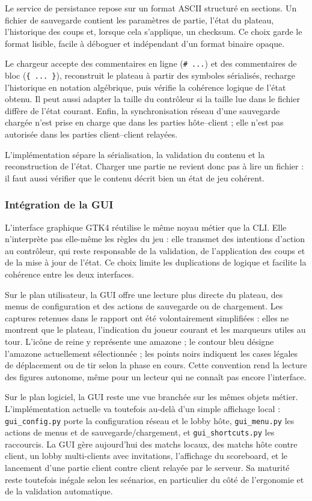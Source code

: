 \documentclass[a4paper]{article}
\begin{document}
Le service de persistance repose sur un format ASCII structuré en sections. Un fichier de sauvegarde contient les paramètres de partie, l'état du plateau, l'historique des coups et, lorsque cela s'applique, un checksum. Ce choix garde le format lisible, facile à déboguer et indépendant d'un format binaire opaque.

Le chargeur accepte des commentaires en ligne (\texttt{\# ...}) et des commentaires de bloc (\texttt{\{ ... \}}), reconstruit le plateau à partir des symboles sérialisés, recharge l'historique en notation algébrique, puis vérifie la cohérence logique de l'état obtenu. Il peut aussi adapter la taille du contrôleur si la taille lue dans le fichier diffère de l'état courant. Enfin, la synchronisation réseau d'une sauvegarde chargée n'est prise en charge que dans les parties hôte--client ; elle n'est pas autorisée dans les parties client--client relayées.

L'implémentation sépare la sérialisation, la validation du contenu et la reconstruction de l'état. Charger une partie ne revient donc pas à lire un fichier : il faut aussi vérifier que le contenu décrit bien un état de jeu cohérent.

\subsubsection{Intégration de la GUI}

L'interface graphique GTK4 réutilise le même noyau métier que la CLI. Elle n'interprète pas elle-même les règles du jeu : elle transmet des intentions d'action au contrôleur, qui reste responsable de la validation, de l'application des coups et de la mise à jour de l'état. Ce choix limite les duplications de logique et facilite la cohérence entre les deux interfaces.

Sur le plan utilisateur, la GUI offre une lecture plus directe du plateau, des menus de configuration et des actions de sauvegarde ou de chargement. Les captures retenues dans le rapport ont été volontairement simplifiées : elles ne montrent que le plateau, l'indication du joueur courant et les marqueurs utiles au tour. L'icône de reine y représente une amazone ; le contour bleu désigne l'amazone actuellement sélectionnée ; les points noirs indiquent les cases légales de déplacement ou de tir selon la phase en cours. Cette convention rend la lecture des figures autonome, même pour un lecteur qui ne connaît pas encore l'interface.

Sur le plan logiciel, la GUI reste une vue branchée sur les mêmes objets métier. L'implémentation actuelle va toutefois au-delà d'un simple affichage local : \texttt{gui\_config.py} porte la configuration réseau et le lobby hôte, \texttt{gui\_menu.py} les actions de menus et de sauvegarde/chargement, et \texttt{gui\_shortcuts.py} les raccourcis. La GUI gère aujourd'hui des matchs locaux, des matchs hôte contre client, un lobby multi-clients avec invitations, l'affichage du scoreboard, et le lancement d'une partie client contre client relayée par le serveur. Sa maturité reste toutefois inégale selon les scénarios, en particulier du côté de l'ergonomie et de la validation automatique.
\end{document}
